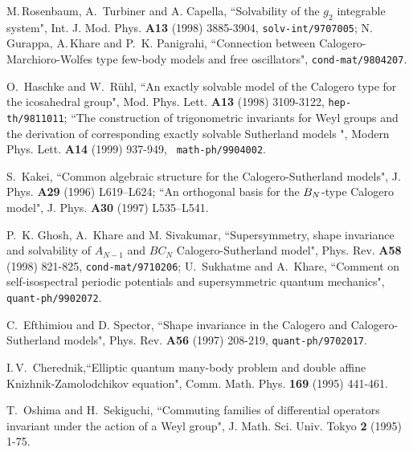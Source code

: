 \documentclass[a4paper,12pt]{article}
\begin{document}
\begin{thebibliography}{99}
M.\,Rosenbaum, A.\, Turbiner and A. Capella, ``Solvability of the \(g_2\)
integrable system", Int. J. Mod. Phys. {\bf A13} (1998) 3885-3904,
{\tt solv-int/9707005};
N. Gurappa, A.\,Khare and P.\, K. Panigrahi,
``Connection between Calogero-Marchioro-Wolfes type few-body models and
free oscillators", {\tt cond-mat/9804207}.



O.\, Haschke  and W.\, R\"uhl, ``An exactly solvable model of the
Calogero
type for the icosahedral group", Mod. Phys. Lett. {\bf A13} (1998)
3109-3122,
{\tt hep-th/9811011};
``The construction of trigonometric invariants for
Weyl groups and the derivation of corresponding exactly solvable
Sutherland
models ",  Modern Phys. Lett. {\bf A14}  (1999) 937-949, {\tt
math-ph/9904002}.

S.\, Kakei, ``Common algebraic structure for the Calogero-Sutherland
models",
J. Phys. {\bf A29} (1996) L619--L624;
``An orthogonal basis for the $B\sb N$-type Calogero model",
J. Phys. {\bf A30} (1997) L535--L541.

 P.\, K. Ghosh, A.\, Khare and M. Sivakumar, ``Supersymmetry, shape
invariance and solvability of \(A_{N-1}\) and \(BC_{N}\)
Calogero-Sutherland
 model", Phys. Rev. {\bf A58} (1998) 821-825, {\tt cond-mat/9710206};
 U.\, Sukhatme and A.\, Khare, ``Comment on self-isospectral periodic
potentials and supersymmetric quantum mechanics", {\tt
quant-ph/9902072}.


C.\, Efthimiou and D. Spector, ``Shape invariance in the Calogero and
Calogero-Sutherland models", Phys. Rev. {\bf A56} (1997) 208-219,
{\tt quant-ph/9702017}.


I.\,V.\, Cherednik,``Elliptic quantum many-body problem
and double affine Knizhnik-Zamolodchikov equation", Comm. Math. Phys.
{\bf 169} (1995) 441-461.

T.\, Oshima and H.\, Sekiguchi, ``Commuting families of differential
operators invariant under the action of a Weyl group",
J. Math. Sci. Univ. Tokyo
{\bf 2}  (1995) 1-75.



\end{thebibliography}
\end{document}

